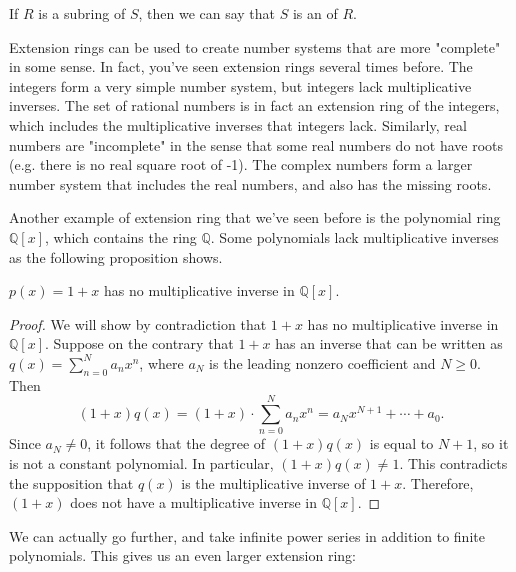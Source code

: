 \begin{defn}\label{ext_ring}
If $R$ is a subring of $S$, then we can say that $S$ is an  of $R$.
\end{defn}

Extension rings  can be used to create number systems that are more "complete" in some sense. In fact, you've seen extension rings several times before. The integers form a very simple number system, but integers lack multiplicative inverses. The set of rational numbers is in fact an extension ring of the integers, which includes the multiplicative inverses that integers lack.  Similarly, real numbers are "incomplete" in the sense that some real numbers do not have roots (e.g. there is no real square root of -1).  The complex numbers form a larger number system that includes the real numbers, and also has the missing roots. 

Another example of extension ring that we've seen before is the polynomial ring ${\mathbb Q}[x]$, which contains the ring ${\mathbb Q}$. Some polynomials lack multiplicative inverses as the following proposition shows.

\begin{prop}
$p(x)=1+x$ has no multiplicative inverse in ${\mathbb Q}[x]$.

\begin{proof}
We will show by contradiction that $1 + x$ has no  multiplicative inverse in 
${\mathbb Q}[x]$. Suppose on the contrary that $1+x$ has an inverse that can be written as $q(x) = \sum_{n=0}^{N}a_nx^n$, where $a_N$ is the leading nonzero coefficient and $N \ge 0$. Then 
\begin{equation*}
(1+x)q(x) = (1+x) \cdot \sum_{n=0}^{N}a_nx^n=a_{N}x^{N+1}+\cdots+a_0.
\end{equation*}
Since $a_N \neq 0$, it follows that the degree of $(1+x)q(x)$ is equal to $N+1$, so it is not a constant polynomial.  In particular, $(1+x)q(x) \neq 1$. This contradicts the supposition that $q(x)$ is the multiplicative inverse of $1+x$. Therefore, $(1+x)$ does not have a  multiplicative inverse in ${\mathbb Q}[x]$. 
\end{proof}
\end{prop}

We can actually go further, and take infinite power series in addition to finite polynomials. This gives us an even larger extension ring:

